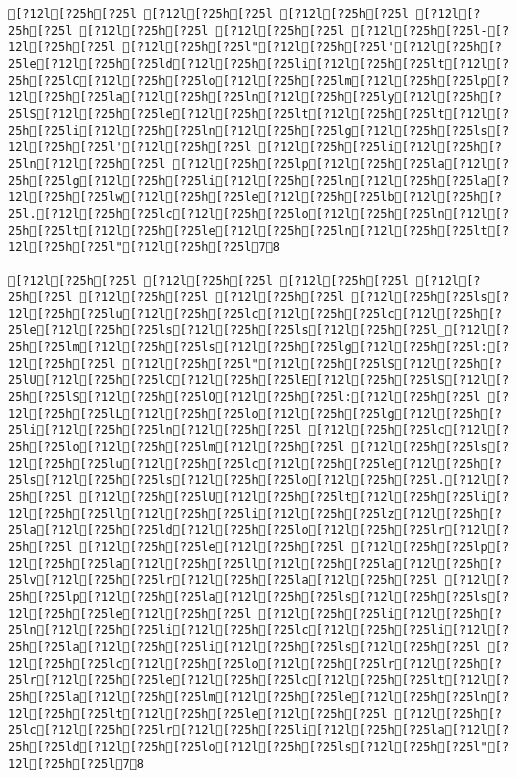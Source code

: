 \documentclass{scrartcl}
\begin{document}
\begin{Verbatim}
[?12l[?25h[?25l [?12l[?25h[?25l [?12l[?25h[?25l [?12l[?25h[?25l [?12l[?25h[?25l [?12l[?25h[?25l [?12l[?25h[?25l-[?12l[?25h[?25l [?12l[?25h[?25l"[?12l[?25h[?25l'[?12l[?25h[?25le[?12l[?25h[?25ld[?12l[?25h[?25li[?12l[?25h[?25lt[?12l[?25h[?25lC[?12l[?25h[?25lo[?12l[?25h[?25lm[?12l[?25h[?25lp[?12l[?25h[?25la[?12l[?25h[?25ln[?12l[?25h[?25ly[?12l[?25h[?25lS[?12l[?25h[?25le[?12l[?25h[?25lt[?12l[?25h[?25lt[?12l[?25h[?25li[?12l[?25h[?25ln[?12l[?25h[?25lg[?12l[?25h[?25ls[?12l[?25h[?25l'[?12l[?25h[?25l [?12l[?25h[?25li[?12l[?25h[?25ln[?12l[?25h[?25l [?12l[?25h[?25lp[?12l[?25h[?25la[?12l[?25h[?25lg[?12l[?25h[?25li[?12l[?25h[?25ln[?12l[?25h[?25la[?12l[?25h[?25lw[?12l[?25h[?25le[?12l[?25h[?25lb[?12l[?25h[?25l.[?12l[?25h[?25lc[?12l[?25h[?25lo[?12l[?25h[?25ln[?12l[?25h[?25lt[?12l[?25h[?25le[?12l[?25h[?25ln[?12l[?25h[?25lt[?12l[?25h[?25l"[?12l[?25h[?25l78

[?12l[?25h[?25l [?12l[?25h[?25l [?12l[?25h[?25l [?12l[?25h[?25l [?12l[?25h[?25l [?12l[?25h[?25l [?12l[?25h[?25ls[?12l[?25h[?25lu[?12l[?25h[?25lc[?12l[?25h[?25lc[?12l[?25h[?25le[?12l[?25h[?25ls[?12l[?25h[?25ls[?12l[?25h[?25l_[?12l[?25h[?25lm[?12l[?25h[?25ls[?12l[?25h[?25lg[?12l[?25h[?25l:[?12l[?25h[?25l [?12l[?25h[?25l"[?12l[?25h[?25lS[?12l[?25h[?25lU[?12l[?25h[?25lC[?12l[?25h[?25lE[?12l[?25h[?25lS[?12l[?25h[?25lS[?12l[?25h[?25lO[?12l[?25h[?25l:[?12l[?25h[?25l [?12l[?25h[?25lL[?12l[?25h[?25lo[?12l[?25h[?25lg[?12l[?25h[?25li[?12l[?25h[?25ln[?12l[?25h[?25l [?12l[?25h[?25lc[?12l[?25h[?25lo[?12l[?25h[?25lm[?12l[?25h[?25l [?12l[?25h[?25ls[?12l[?25h[?25lu[?12l[?25h[?25lc[?12l[?25h[?25le[?12l[?25h[?25ls[?12l[?25h[?25ls[?12l[?25h[?25lo[?12l[?25h[?25l.[?12l[?25h[?25l [?12l[?25h[?25lU[?12l[?25h[?25lt[?12l[?25h[?25li[?12l[?25h[?25ll[?12l[?25h[?25li[?12l[?25h[?25lz[?12l[?25h[?25la[?12l[?25h[?25ld[?12l[?25h[?25lo[?12l[?25h[?25lr[?12l[?25h[?25l [?12l[?25h[?25le[?12l[?25h[?25l [?12l[?25h[?25lp[?12l[?25h[?25la[?12l[?25h[?25ll[?12l[?25h[?25la[?12l[?25h[?25lv[?12l[?25h[?25lr[?12l[?25h[?25la[?12l[?25h[?25l [?12l[?25h[?25lp[?12l[?25h[?25la[?12l[?25h[?25ls[?12l[?25h[?25ls[?12l[?25h[?25le[?12l[?25h[?25l [?12l[?25h[?25li[?12l[?25h[?25ln[?12l[?25h[?25li[?12l[?25h[?25lc[?12l[?25h[?25li[?12l[?25h[?25la[?12l[?25h[?25li[?12l[?25h[?25ls[?12l[?25h[?25l [?12l[?25h[?25lc[?12l[?25h[?25lo[?12l[?25h[?25lr[?12l[?25h[?25lr[?12l[?25h[?25le[?12l[?25h[?25lc[?12l[?25h[?25lt[?12l[?25h[?25la[?12l[?25h[?25lm[?12l[?25h[?25le[?12l[?25h[?25ln[?12l[?25h[?25lt[?12l[?25h[?25le[?12l[?25h[?25l [?12l[?25h[?25lc[?12l[?25h[?25lr[?12l[?25h[?25li[?12l[?25h[?25la[?12l[?25h[?25ld[?12l[?25h[?25lo[?12l[?25h[?25ls[?12l[?25h[?25l"[?12l[?25h[?25l78


\end{Verbatim}
\end{document}
